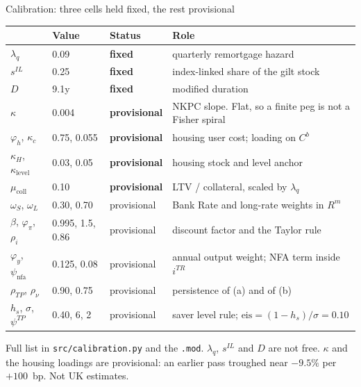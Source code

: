 \documentclass[11pt,aspectratio=169]{beamer}
\begin{document}
\begin{frame}{Calibration: three cells held fixed, the rest provisional}
  {\footnotesize
  \setlength{\tabcolsep}{3.5pt}
  \renewcommand{\arraystretch}{1.02}
  \begin{tabular}{@{}lll>{\raggedright\arraybackslash}p{5.5cm}@{}}
    \toprule
    & Value & Status & Role \\
    \midrule
    $\lambda_{q}$ & 0.09 & \textbf{fixed} & quarterly remortgage hazard \\
    $s^{IL}$ & 0.25 & \textbf{fixed} & index-linked share of the gilt stock \\
    $D$ & 9.1y & \textbf{fixed} & modified duration \\
    $\kappa$ & 0.004 & \textbf{provisional} & NKPC slope. Flat, so a finite peg is not a Fisher spiral \\
    $\varphi_{h}$, $\kappa_{c}$ & 0.75, 0.055 & \textbf{provisional} & housing user cost; loading on $C^{b}$ \\
    $\kappa_{H}$, $\kappa_{\mathrm{level}}$ & 0.03, 0.05 & \textbf{provisional} & housing stock and level anchor \\
    $\mu_{\mathrm{coll}}$ & 0.10 & \textbf{provisional} & LTV / collateral, scaled by $\lambda_{q}$ \\
    $\omega_{S}$, $\omega_{L}$ & 0.30, 0.70 & provisional & Bank Rate and long-rate weights in $R^{m}$ \\
    $\beta$, $\varphi_{\pi}$, $\rho_{i}$ & 0.995, 1.5, 0.86 & provisional & discount factor and the Taylor rule \\
    $\varphi_{y}$, $\psi_{\mathrm{nfa}}$ & 0.125, 0.08 & provisional & annual output weight; NFA term inside $i^{TR}$ \\
    $\rho_{TP}$, $\rho_{\nu}$ & 0.90, 0.75 & provisional & persistence of (a) and of (b) \\
    $h_{s}$, $\sigma$, $\psi^{TP}$ & 0.40, 6, 2 & provisional & saver level rule; $\mathrm{eis}=(1-h_{s})/\sigma=0.10$ \\
    \bottomrule
  \end{tabular}
  }
  \vspace{0.15em}
  {\scriptsize
  Full list in \texttt{src/calibration.py} and the \texttt{.mod}.
  $\lambda_{q}$, $s^{IL}$ and $D$ are not free.
  $\kappa$ and the housing loadings are provisional: an earlier pass
  troughed near $-9.5\%$ per $+100$~bp. Not UK estimates.}
\end{frame}
\end{document}
